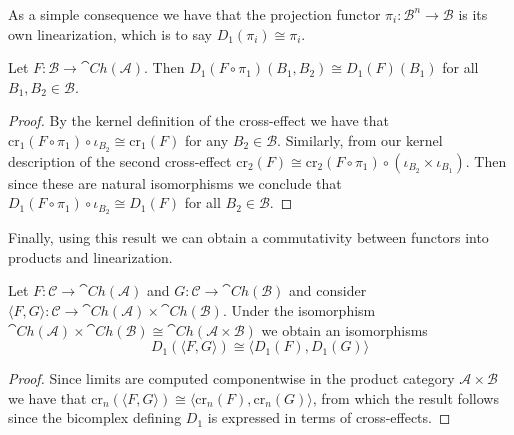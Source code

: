 As a simple consequence we have that the projection functor $\pi_i:\mathcal{B}^n\to \mathcal{B}$ is its own linearization, which is to say $D_1(\pi_i)\cong \pi_i$.


\begin{cor}[label=cor:constLinearization]
    Let $F:\mathcal{B}\to \cat{Ch}(\mathcal{A})$. Then $D_1(F\circ \pi_1)(B_1,B_2)\cong D_1(F)(B_1)$ for all $B_1,B_2 \in \mathcal{B}$.
\end{cor}
\begin{proof}
    By the kernel definition of the cross-effect we have that $\text{cr}_1(F\circ \pi_1)\circ \iota_{B_2}\cong \text{cr}_1(F)$ for any $B_2 \in \mathcal{B}$. Similarly, from our kernel description of the second cross-effect $\text{cr}_2(F)\cong \text{cr}_2(F\circ \pi_1)\circ (\iota_{B_2}\times \iota_{B_1})$. Then since these are natural isomorphisms we conclude that $D_1(F\circ \pi_1)\circ \iota_{B_2}\cong D_1(F)$ for all $B_2 \in \mathcal{B}$.
\end{proof}

Finally, using this result we can obtain a commutativity between functors into products and linearization.

\begin{lem}[label=lem:5.18]
    Let $F:\mathcal{C}\to \cat{Ch}(\mathcal{A})$ and $G:\mathcal{C}\to \cat{Ch}(\mathcal{B})$ and consider $\langle F,G\rangle:\mathcal{C}\to \cat{Ch}(\mathcal{A})\times \cat{Ch}(\mathcal{B})$. Under the isomorphism $\cat{Ch}(\mathcal{A})\times \cat{Ch}(\mathcal{B}) \cong \cat{Ch}(\mathcal{A}\times \mathcal{B})$ we obtain an isomorphisms
    \begin{equation*}
        D_1(\langle F,G\rangle) \cong \langle D_1(F),D_1(G)\rangle
    \end{equation*}
\end{lem}
\begin{proof}
    Since limits are computed componentwise in the product category $\mathcal{A}\times \mathcal{B}$ we have that $\text{cr}_n(\langle F,G\rangle) \cong \langle \text{cr}_n(F),\text{cr}_n(G)\rangle$, from which the result follows since the bicomplex defining $D_1$ is expressed in terms of cross-effects.
\end{proof}

